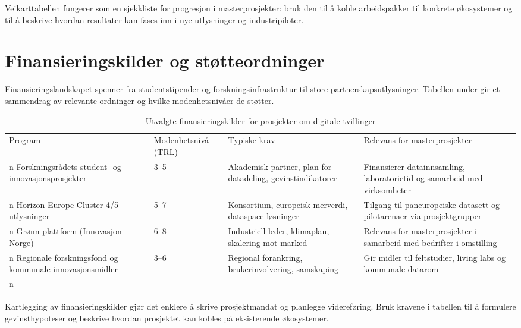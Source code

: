 Veikarttabellen fungerer som en sjekkliste for progresjon i masterprosjekter: bruk den til å koble arbeidspakker til konkrete økosystemer og til å beskrive hvordan resultater kan fases inn i nye utlysninger og industripiloter.

\section{Finansieringskilder og støtteordninger}
Finansieringslandskapet spenner fra studentstipender og forskningsinfrastruktur til store partnerskapsutlysninger. Tabellen under gir et sammendrag av relevante ordninger og hvilke modenhetsnivåer de støtter.

\begin{table}[h]
    \centering
    \caption{Utvalgte finansieringskilder for prosjekter om digitale tvillinger}
    \label{tab:finansiering}
    \begin{tabular}{p{3.0cm}p{2.4cm}p{4.3cm}p{3.5cm}}
        \toprule
        Program & Modenhetsnivå (TRL) & Typiske krav & Relevans for masterprosjekter \\n        \midrule
        Forskningsrådets student- og innovasjonsprosjekter & 3--5 & Akademisk partner, plan for datadeling, gevinstindikatorer & Finansierer datainnsamling, laboratorietid og samarbeid med virksomheter \\n        Horizon Europe Cluster 4/5 utlysninger & 5--7 & Konsortium, europeisk merverdi, dataspace-løsninger & Tilgang til paneuropeiske datasett og pilotarenaer via prosjektgrupper \\n        Grønn plattform (Innovasjon Norge) & 6--8 & Industriell leder, klimaplan, skalering mot marked & Relevans for masterprosjekter i samarbeid med bedrifter i omstilling \\n        Regionale forskningsfond og kommunale innovasjonsmidler & 3--6 & Regional forankring, brukerinvolvering, samskaping & Gir midler til feltstudier, living labs og kommunale datarom \\n        \bottomrule
    \end{tabular}
\end{table}

Kartlegging av finansieringskilder gjør det enklere å skrive prosjektmandat og planlegge videreføring. Bruk kravene i tabellen til å formulere gevinsthypoteser og beskrive hvordan prosjektet kan kobles på eksisterende økosystemer.\citep{rcn2024programkatalog,eu2024digitaltwinroadmap,innovasjon2024gronnplattform}

